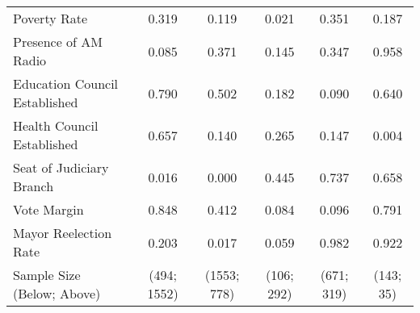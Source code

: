 \begin{table}[!htbp]
\begin{tabular}{lcc@{\extracolsep{4pt}}ccc}
  Poverty Rate                         & 0.319 & 0.119 & 0.021 & 0.351 & 0.187 \T \B \\
  Presence of AM Radio                 & 0.085 & 0.371 & 0.145 & 0.347 & 0.958 \T \B \\
  Education Council Established        & 0.790 & 0.502 & 0.182 & 0.090 & 0.640 \T \B \\
  Health Council Established           & 0.657 & 0.140 & 0.265 & 0.147 & 0.004 \T \B \\
  Seat of Judiciary Branch             & 0.016 & 0.000 & 0.445 & 0.737 & 0.658 \T \B \\
  Vote Margin                          & 0.848 & 0.412 & 0.084 & 0.096 & 0.791 \T \B \\
  Mayor Reelection Rate                & 0.203 & 0.017 & 0.059 & 0.982 & 0.922 \T \B \\
  \hline
  Sample Size (Below; Above)           & (494; 1552) & (1553; 778) & (106; 292) & (671; 319) & (143; 35) \T \B \\
  \hline

  \hline
  \end{tabular}
\end{table}
